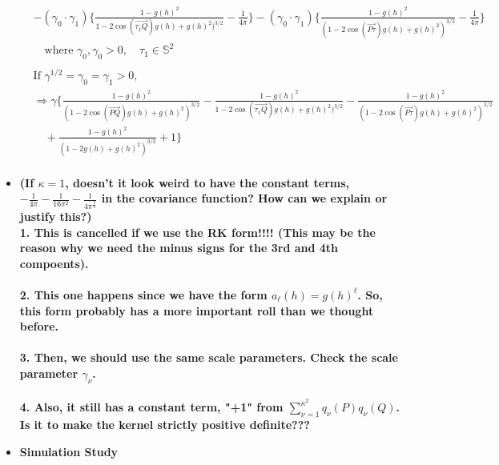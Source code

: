 \documentclass[11pt]{article}
\begin{document}
\begin{itemize}
\begin{align*}
&- (\gamma_0 \cdot \gamma_1) \biggl\{ \frac{1 - g(h)^2}{1-2 \cos{(\overrightarrow{\tau_1 Q})} g(h) + g(h)^2)^{3/2}} - \frac{1}{4\pi} \biggl\} - (\gamma_0 \cdot \gamma_1) \biggl\{ \frac{1 - g(h)^2}{(1-2 \cos{(\overrightarrow{P \tau})} g(h) + g(h)^2)^{3/2}} - \frac{1}{4\pi} \biggl\}\\
&\quad \text{where } \gamma_0, \gamma_{0}>0, \quad \tau_{1} \in \mathbb{S}^2 \\
\\
&\text{If $\gamma^{1/2} = \gamma_0 = \gamma_1 > 0$}, \\
&\Rightarrow \gamma \Biggl\{ \frac{1 - g(h)^2}{(1-2 \cos{(\overrightarrow{PQ})} g(h) + g(h)^2)^{3/2}} - \frac{1 - g(h)^2}{1-2 \cos{(\overrightarrow{\tau_1 Q})} g(h) + g(h)^2)^{3/2}} - \frac{1 - g(h)^2}{(1-2 \cos{(\overrightarrow{P \tau})} g(h) + g(h)^2)^{3/2}}\\
&\quad + \frac{1 - g(h)^2}{(1-2 g(h) + g(h)^2)^{3/2}} + 1 \Biggl\} \\
\end{align*}

\item
\textbf{{\color{red} (If $\kappa=1$, doesn't it look weird to have the constant terms, $-\frac{1}{4\pi} - \frac{1}{16\pi^2} - \frac{1}{4\pi^\frac{3}{2}}$ in the covariance function? How can we explain or justify this?)}}\\ 
\textbf{{\color{blue} 1. This is cancelled if we use the RK form!!!! (This may be the reason why we need the minus signs for the 3rd and 4th compoents).}}\\
\\
\textbf{{\color{blue} 2. This one happens since we have the form $a_\ell(h) = g(h)^\ell$. So, this form probably has a more important roll than we thought before.}}\\ 
\\
\textbf{{\color{blue} 3. Then, we should use the same scale parameters. Check the scale parameter $\gamma_\nu$.}}\\
\\
\textbf{{\color{blue} 4. Also, it still has a constant term, "+1" from $\sum_{\nu=1}^{\kappa^2}q_{\nu}(P) q_{\nu}(Q)$. Is it to make the kernel strictly positive definite???}}\\

\pagebreak

\item \textbf{Simulation Study}\\


\end{itemize}
\end{document}
